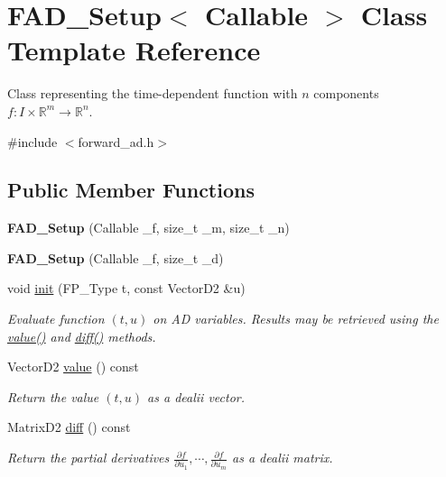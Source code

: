 \hypertarget{classFAD__Setup}{}\section{F\+A\+D\+\_\+\+Setup$<$ Callable $>$ Class Template Reference}
\label{classFAD__Setup}


Class representing the time-\/dependent function with $n$ components $f:I\times\mathbb{R}^m \rightarrow \mathbb{R}^n$.  




{\ttfamily \#include $<$forward\+\_\+ad.\+h$>$}

\subsection*{Public Member Functions}
\begin{DoxyCompactItemize}
\item 
\mbox{\label{classFAD__Setup_ae0ae46102439eb707618da04507437fd}} 
{\bfseries F\+A\+D\+\_\+\+Setup} (Callable \+\_\+f, size\+\_\+t \+\_\+m, size\+\_\+t \+\_\+n)
\item 
\mbox{\label{classFAD__Setup_a22e72ff87bdaee5d3d00a5f8a93628d2}} 
{\bfseries F\+A\+D\+\_\+\+Setup} (Callable \+\_\+f, size\+\_\+t \+\_\+d)
\item 
void \hyperlink{classFAD__Setup_ac373589f0ea65f0d7f53e9770926e836}{init} (F\+P\+\_\+\+Type t, const Vector\+D2 \&u)
\begin{DoxyCompactList}\small\item\em Evaluate function $(t, u)$ on AD variables. Results may be retrieved using the {\ttfamily \hyperlink{classFAD__Setup_a0aab26eb92ab9fc32e6dd642b2d70a5e}{value()}} and {\ttfamily \hyperlink{classFAD__Setup_ae8e45825152e0ea2465e1ff17cab7d34}{diff()}} methods. \end{DoxyCompactList}\item 
\mbox{\label{classFAD__Setup_a0aab26eb92ab9fc32e6dd642b2d70a5e}} 
Vector\+D2 \hyperlink{classFAD__Setup_a0aab26eb92ab9fc32e6dd642b2d70a5e}{value} () const
\begin{DoxyCompactList}\small\item\em Return the value $(t, u)$ as a {\ttfamily dealii} vector. \end{DoxyCompactList}\item 
\mbox{\label{classFAD__Setup_ae8e45825152e0ea2465e1ff17cab7d34}} 
Matrix\+D2 \hyperlink{classFAD__Setup_ae8e45825152e0ea2465e1ff17cab7d34}{diff} () const
\begin{DoxyCompactList}\small\item\em Return the partial derivatives $\frac{\partial f}{\partial u_1},\cdots,\frac{\partial f}{\partial u_m}$ as a {\ttfamily dealii} matrix. \end{DoxyCompactList}\end{DoxyCompactItemize}


